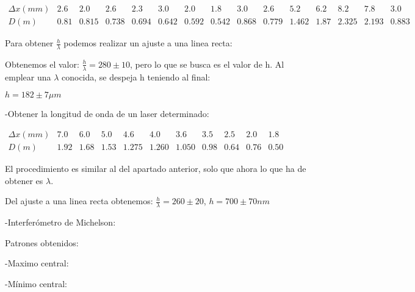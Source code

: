 \documentclass[12pt,thmsa]{article}
\begin{document}
$
\begin{array}{lllllllllllllll}
\Delta x(mm) & 2.6 & 2.0 & 2.6 & 2.3 & 3.0 & 2.0 & 1.8 & 3.0 & 2.6 & 5.2 & 
6.2 & 8.2 & 7.8 & 3.0 \\ 
D(m) & 0.81 & 0.815 & 0.738 & 0.694 & 0.642 & 0.592 & 0.542 & 0.868 & 0.779
& 1.462 & 1.87 & 2.325 & 2.193 & 0.883
\end{array}
$

Para obtener $\frac{h}{\lambda }$ podemos realizar un ajuste a una linea
recta:

Obtenemos el valor: $\frac{h}{\lambda }=280\pm 10$, pero lo que se busca es
el valor de h. Al emplear una $\lambda $ conocida, se despeja h teniendo al
final:

$h=182\pm 7\mu m$

-Obtener la longitud de onda de un laser determinado:

\vspace{1pt}$
\begin{array}{lllllllllll}
\Delta x(mm) & 7.0 & 6.0 & 5.0 & 4.6 & 4.0 & 3.6 & 3.5 & 2.5 & 2.0 & 1.8 \\ 
D(m) & 1.92 & 1.68 & 1.53 & 1.275 & 1.260 & 1.050 & 0.98 & 0.64 & 0.76 & 0.50
\end{array}
$

El procedimiento es similar al del apartado anterior, solo que ahora lo que
ha de obtener es $\lambda $.

Del ajuste a una linea recta obtenemos: $\frac{h}{\lambda }=260\pm 20$, $%
h=700\pm 70nm$

\vspace{1pt}

-Interfer\'{o}metro de Michelson:

Patrones obtenidos:

\qquad -Maximo central:


\qquad -M\'{i}nimo central:

\end{document}
